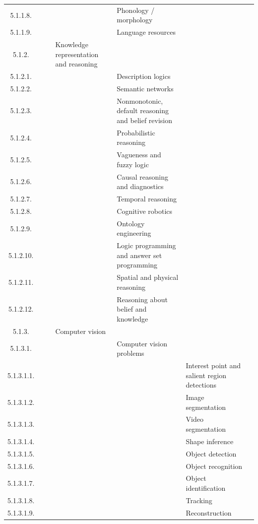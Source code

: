 \documentclass[12pt]{article}
\begin{document}
\begin{center}
{\begin{tabularx}{\linewidth}{|c|X|X|X|X|X|X|}
		5.1.1.8. &   &   &   &  Phonology / morphology &   &   \\
		5.1.1.9. &   &   &   &  Language resources &   &   \\
		5.1.2. &   &   &  Knowledge representation and reasoning &   &   &   \\
		5.1.2.1. &   &   &   &  Description logics &   &   \\
		5.1.2.2. &   &   &   &  Semantic networks &   &   \\
		5.1.2.3. &   &   &   &  Nonmonotonic, default reasoning and belief revision &   &   \\
		5.1.2.4. &   &   &   &  Probabilistic reasoning &   &   \\
		5.1.2.5. &   &   &   &  Vagueness and fuzzy logic &   &   \\
		5.1.2.6. &   &   &   &  Causal reasoning and diagnostics &   &   \\
		5.1.2.7. &   &   &   &  Temporal reasoning &   &   \\
		5.1.2.8. &   &   &   &  Cognitive robotics &   &   \\
		5.1.2.9. &   &   &   &  Ontology engineering &   &   \\
		5.1.2.10. &   &   &   &  Logic programming and answer set programming &   &   \\
		5.1.2.11. &   &   &   &  Spatial and physical reasoning &   &   \\
		5.1.2.12. &   &   &   &  Reasoning about belief and knowledge &   &   \\
		5.1.3. &   &   &  Computer vision &   &   &   \\
		5.1.3.1. &   &   &   &  Computer vision problems &   &   \\
		5.1.3.1.1. &   &   &   &   &  Interest point and salient region detections &   \\
		5.1.3.1.2. &   &   &   &   &  Image segmentation &   \\
		5.1.3.1.3. &   &   &   &   &  Video segmentation &   \\
		5.1.3.1.4. &   &   &   &   &  Shape inference &   \\
		5.1.3.1.5. &   &   &   &   &  Object detection &   \\
		5.1.3.1.6. &   &   &   &   &  Object recognition &   \\
		5.1.3.1.7. &   &   &   &   &  Object identification &   \\
		5.1.3.1.8. &   &   &   &   &  Tracking &   \\
		5.1.3.1.9. &   &   &   &   &  Reconstruction &   \\

\end{tabularx}}
\end{center}
\end{document}
